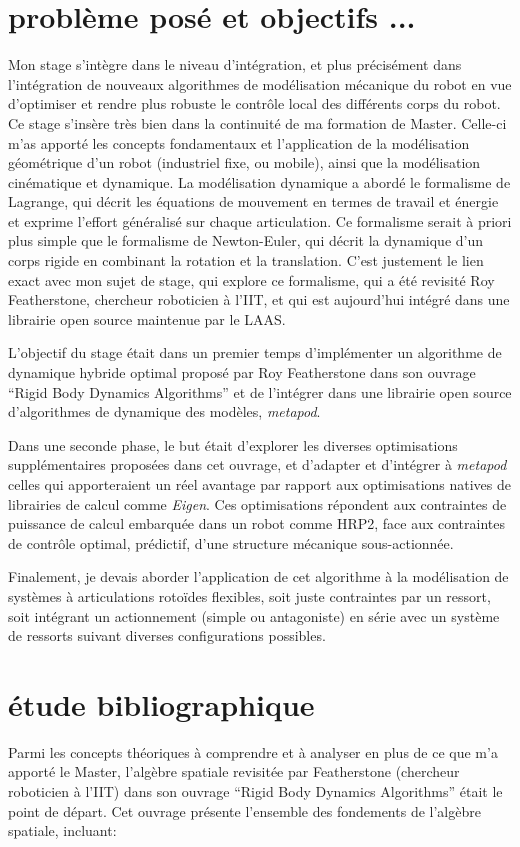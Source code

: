\documentclass{report}
\begin{document}
\section*{problème posé et objectifs ...}

Mon stage s'intègre dans le niveau d'intégration, et plus précisément dans l'intégration de nouveaux algorithmes de modélisation mécanique du robot en vue d'optimiser et rendre plus robuste le contrôle local des différents corps du robot. Ce stage s'insère très bien dans la continuité de ma formation de Master. Celle-ci m'as apporté les concepts fondamentaux et l'application de la modélisation géométrique d'un robot (industriel fixe, ou mobile), ainsi que la modélisation cinématique et dynamique. La modélisation dynamique a abordé le formalisme de Lagrange, qui décrit les équations de mouvement en termes de travail et énergie et exprime l'effort généralisé sur chaque articulation. Ce formalisme serait à priori plus simple que le formalisme de Newton-Euler, qui décrit la dynamique d'un corps rigide en combinant la rotation et la translation. C'est justement le lien exact avec mon sujet de stage, qui explore ce formalisme, qui a été revisité Roy Featherstone, chercheur roboticien à l'IIT, et qui est aujourd'hui intégré dans une librairie open source maintenue par le LAAS.

L'objectif du stage était dans un premier temps d'implémenter un algorithme de dynamique hybride optimal proposé par Roy Featherstone dans son ouvrage “Rigid Body Dynamics Algorithms” \cite{bib_featherstone} et de l'intégrer dans une librairie open source d'algorithmes de dynamique des modèles, \emph{metapod}.

Dans une seconde phase, le but était d'explorer les diverses optimisations supplémentaires proposées dans cet ouvrage, et d'adapter et d'intégrer à \emph{metapod} celles qui apporteraient un réel avantage par rapport aux optimisations natives de librairies de calcul comme \emph{Eigen}. Ces optimisations répondent aux contraintes de puissance de calcul embarquée dans un robot comme HRP2, face aux contraintes de contrôle optimal, prédictif, d'une structure mécanique sous-actionnée.

Finalement, je devais aborder l'application de cet algorithme à la modélisation de systèmes à articulations rotoïdes flexibles, soit juste contraintes par un ressort, soit intégrant un actionnement (simple ou antagoniste) en série avec un système de ressorts suivant diverses configurations possibles.

\section*{étude bibliographique}
Parmi les concepts théoriques à comprendre et à analyser en plus de ce que m'a apporté le Master, l'algèbre spatiale revisitée par Featherstone (chercheur roboticien à l'IIT) dans son ouvrage “Rigid Body Dynamics Algorithms” \cite{bib_featherstone} était le point de départ. Cet ouvrage présente l'ensemble des fondements de l'algèbre spatiale, incluant:
\end{document}
